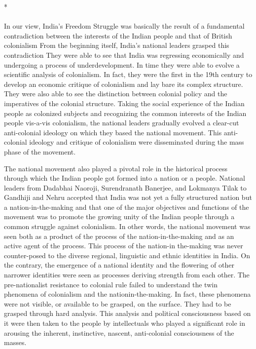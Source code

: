 \begin{center}*\end{center}

\paragraph*{}
In our view, India's Freedom Struggle was basically the result of a fundamental contradiction between the interests of the Indian people and that of British colonialism From the beginning itself, India's national leaders grasped this contradiction They were able to see that India was regressing economically and undergoing a process of underdevelopment. In time they were able to evolve a scientific analysis of colonialism. In fact, they were the first in the 19th century to develop an economic critique of colonialism and lay bare its complex structure. They were also able to see the distinction between colonial policy and the imperatives of the colonial structure. Taking the social experience of the Indian people as colonized subjects and recognizing the common interests of the Indian people vis-a-vis colonialism, the national leaders gradually evolved a clear-cut anti-colonial ideology on which they based the national movement. This anti-colonial ideology and critique of colonialism were disseminated during the mass phase of the movement.

The national movement also played a pivotal role in the historical process through which the Indian people got formed into a nation or a people. National leaders from Dadabhai Naoroji, Surendranath Banerjee, and Lokmanya Tilak to Gandhiji and Nehru accepted that India was not yet a fully structured nation but a nation-in-the-making and that one of the major objectives and functions of the movement was to promote the growing unity of the Indian people through a common struggle against colonialism. In other words, the national movement was seen both as a product of the process of the nation-in-the-making and as an active agent of the process. This process of the nation-in­ the-making was never counter-posed to the diverse regional, linguistic and ethnic identities in India. On the contrary, the emergence of a national identity and the flowering of other narrower identities were seen as processes deriving strength from each other. The pre-nationalist resistance to colonial rule failed to understand the twin phenomena of colonialism and the nation­in-the-making. In fact, these phenomena were not visible, or available to be grasped, on the surface. They had to be grasped through hard analysis. This analysis and political consciousness based on it were then taken to the people by intellectuals who played a significant role in arousing the inherent, instinctive, nascent, anti-colonial consciousness of the masses.

